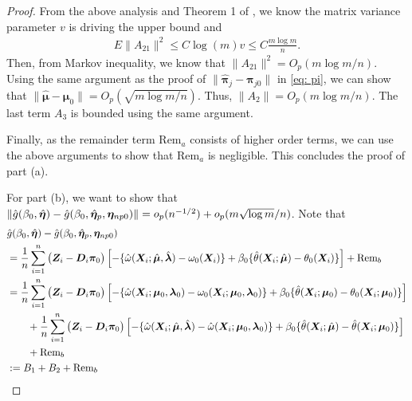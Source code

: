 \documentclass[12pt]{article}
\begin{document}
{\begin{proof}
From the above analysis and Theorem 1 of \cite{tropp2015expected}, we know the matrix variance parameter $ v $ is driving the upper bound and 
\begin{align*}
	E \|A_{21} \|^2 \leq C\log (m)  v \leq C \frac{m \log m}{n}. 
\end{align*}
Then, from Markov inequality, we know that  $  \|A_{21}\|^2= O_p( m\log m /n )$.  Using the same argument as the proof of $ \|\hat{\bm\pi}_j -   {\bm\pi}_{j0} \| $  in \eqref{eq: pi}, we can show that $ \|\hat{\bm \mu}- \bm\mu_0 \| = O_p( \sqrt{m\log m/n} )$. Thus,  $\| A_{2} \| =  O_p( m \log m/n ) $.  The last term $ A_3 $ is bounded using the same argument. 
 
 Finally, as the remainder term $ \text{Rem}_a $ consists of higher order terms, we can use the above arguments to show that  $ \text{Rem}_a $  is negligible. This concludes the proof of part (a). 

For part (b), we want to show that   $ \| \hat g(\beta_0,  \hat {\bm \eta}) -   \hat 	g( \beta_0, \hat {\bm \eta}_{p},  \bm \eta_{np0})  \|=o_p(n^{-1/2}) + o_p(m\sqrt{\log m} /n)$. Note that 
\begin{align*}
& \hat g(\beta_0,  \hat {\bm \eta}) - \hat 	g( \beta_0, \hat {\bm \eta}_{p},  \bm \eta_{np0})  \\
 &= \frac{1}{n} \sum_{i=1}^{n}    \big( \bm{Z}_i-\bm D_i \bm\pi_0 \big)  \left[ - \{\hat\omega(\bm{X}_i; \hat{\bm \mu}, \hat{\bm \lambda}) - \omega_0(\bm{X}_i) \} + \beta_0 \{ \hat\theta(\bm{X}_i; \hat{\bm\mu})- \theta_0(\bm{X}_i)\} \right] +\text{Rem}_b\\
 &= \frac{1}{n} \sum_{i=1}^{n}    \big( \bm{Z}_i-\bm D_i \bm\pi_0 \big)  \left[ - \{\hat \omega(\bm{X}_i; {\bm \mu}_0, {\bm \lambda}_0 ) - \omega_0(\bm{X}_i; \bm\mu_0,{\bm \lambda}_0) \} + \beta_0 \{ \hat\theta(\bm{X}_i; {\bm \mu}_0) -  \theta_0(\bm{X}_i; {\bm \mu}_0)\} \right]  \\
&\qquad + \frac{1}{n} \sum_{i=1}^{n}   \big( \bm{Z}_i-\bm D_i \bm\pi_0 \big)  \left[ - \{\hat\omega(\bm{X}_i; \hat{\bm \mu}, \hat{\bm \lambda}) - \hat\omega(\bm{X}_i; {\bm \mu}_0, {\bm \lambda}_0) \} + \beta_0 \{ \hat\theta(\bm{X}_i; \hat{\bm\mu})- \hat\theta(\bm{X}_i; {\bm \mu}_0)\} \right] \\
 &\qquad+\text{Rem}_b\\
 &:= B_1+B_2+\text{Rem}_b 
\end{align*}  




\end{proof}}
\end{document}
